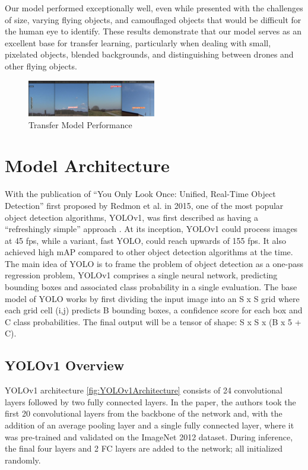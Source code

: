 \documentclass[10pt,twocolumn,letterpaper]{article}
\begin{document}
Our model performed exceptionally well, even while presented with the challenges of size, varying flying objects, and camouflaged objects that would be difficult for the human eye to identify. These results demonstrate that our model serves as an excellent base for transfer learning, particularly when dealing with small, pixelated objects, blended backgrounds, and distinguishing between drones and other flying objects.

\begin{figure}[h]
    \centering
    \includegraphics[width=0.5\textwidth]{figures/transfer_model.png}
    \caption{Transfer Model Performance \cite{TransferDataset}}
    \label{fig:Transfer Model Performance}
\end{figure}


\section{Model Architecture}
With the publication of “You Only Look Once: Unified, Real-Time Object Detection” first proposed by Redmon et al.\cite{YOLO_OG} in 2015, one of the most popular object detection algorithms, YOLOv1, was first described as having a “refreshingly simple” approach \cite{CompReview}. At its inception, YOLOv1 could process images at 45 fps, while a variant, fast YOLO, could reach upwards of 155 fps. It also achieved high mAP compared to other object detection algorithms at the time.\\
\indent The main idea of YOLO is to frame the problem of object detection as a one-pass regression problem, YOLOv1 comprises a single neural network, predicting bounding boxes and associated class probability in a single evaluation. The base model of YOLO works by first dividing the input image into an S x S grid where each grid cell (i,j) predicts B bounding boxes, a confidence score for each box and C class probabilities. The final output will be a tensor of shape: S x S x (B x 5 + C).

\subsection{YOLOv1 Overview}
YOLOv1 architecture \ref{fig:YOLOv1Architecture} consists of 24 convolutional layers followed by two fully connected layers. In the paper, the authors took the first 20 convolutional layers from the backbone of the network and, with the addition of an average pooling layer and a single fully connected layer, where it was pre-trained and validated on the ImageNet 2012 dataset. During inference, the final four layers and 2 FC layers are added to the network; all initialized randomly.
\end{document}
